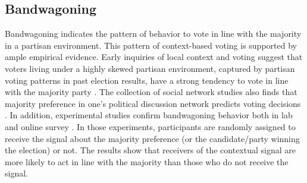 \documentclass[letterpaper, 12pt]{article}
\begin{document}
    \subsection*{Bandwagoning}

    \par Bandwagoning indicates the pattern of behavior to vote in line with the majority in a partisan environment. This pattern of context-based voting is supported by ample empirical evidence. Early inquiries of local context and voting suggest that voters living under a highly skewed partisan environment, captured by partisan voting patterns in past election results, have a strong tendency to vote in line with the majority party \citep{Miller1956onpo, Putnam1966poat}. The collection of social network studies also finds that majority preference in one's political discussion network predicts voting decisions \citep{Huckfeldt1987nein, Huckfeldt1995cipo, Huckfeldt2014nobi}. In addition, experimental studies confirm bandwagoning behavior both in lab \citep{Bischoff2013soin, Morton2015whmo, Tyran2016exev} and online survey \citep{Roy2015anex,vanderMeer2016ofth, Dahlgaard2017hoel}. In those experiments, participants are randomly assigned to receive the signal about the majority preference (or the candidate/party winning the election) or not. The results show that receivers of the contextual signal are more likely to act in line with the majority than those who do not receive the signal.
\end{document}
